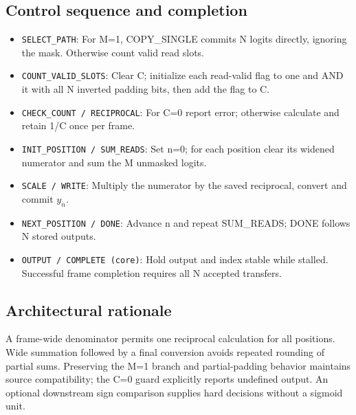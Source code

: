 \documentclass[11pt,a4paper]{article}
\begin{document}
\subsection{Control sequence and completion}
\begin{itemize}
\item \texttt{SELECT\_PATH}: For M=1, COPY_SINGLE commits N logits directly, ignoring the mask. Otherwise count valid read slots.
\item \texttt{COUNT\_VALID\_SLOTS}: Clear C; initialize each read-valid flag to one and AND it with all N inverted padding bits, then add the flag to C.
\item \texttt{CHECK\_COUNT / RECIPROCAL}: For C=0 report error; otherwise calculate and retain 1/C once per frame.
\item \texttt{INIT\_POSITION / SUM\_READS}: Set n=0; for each position clear its widened numerator and sum the M unmasked logits.
\item \texttt{SCALE / WRITE}: Multiply the numerator by the saved reciprocal, convert and commit $y_n$.
\item \texttt{NEXT\_POSITION / DONE}: Advance n and repeat SUM_READS; DONE follows N stored outputs.
\item \texttt{OUTPUT / COMPLETE (core)}: Hold output and index stable while stalled. Successful frame completion requires all N accepted transfers.
\end{itemize}

\subsection{Architectural rationale}
A frame-wide denominator permits one reciprocal calculation for all positions. Wide summation followed by a final conversion avoids repeated rounding of partial sums. Preserving the M=1 branch and partial-padding behavior maintains source compatibility; the C=0 guard explicitly reports undefined output. An optional downstream sign comparison supplies hard decisions without a sigmoid unit.
\end{document}
